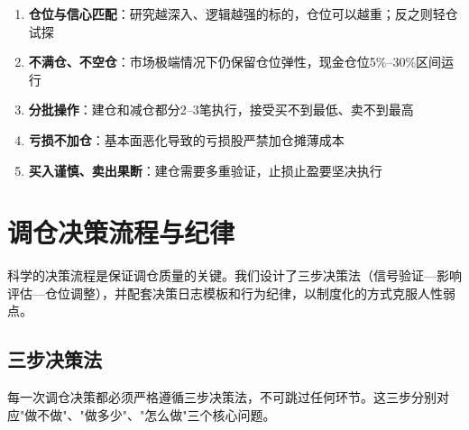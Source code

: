 \begin{keyinsight}[仓位管理的核心原则]
\begin{enumerate}[leftmargin=1.8em]
\item \textbf{仓位与信心匹配}：研究越深入、逻辑越强的标的，仓位可以越重；反之则轻仓试探
\item \textbf{不满仓、不空仓}：市场极端情况下仍保留仓位弹性，现金仓位5\%--30\%区间运行
\item \textbf{分批操作}：建仓和减仓都分2--3笔执行，接受买不到最低、卖不到最高
\item \textbf{亏损不加仓}：基本面恶化导致的亏损股严禁加仓摊薄成本
\item \textbf{买入谨慎、卖出果断}：建仓需要多重验证，止损止盈要坚决执行
\end{enumerate}
\end{keyinsight}

\section{调仓决策流程与纪律}

科学的决策流程是保证调仓质量的关键。我们设计了三步决策法（信号验证—影响评估—仓位调整），并配套决策日志模板和行为纪律，以制度化的方式克服人性弱点。

\subsection{三步决策法}

每一次调仓决策都必须严格遵循三步决策法，不可跳过任何环节。这三步分别对应"做不做"、"做多少"、"怎么做"三个核心问题。

